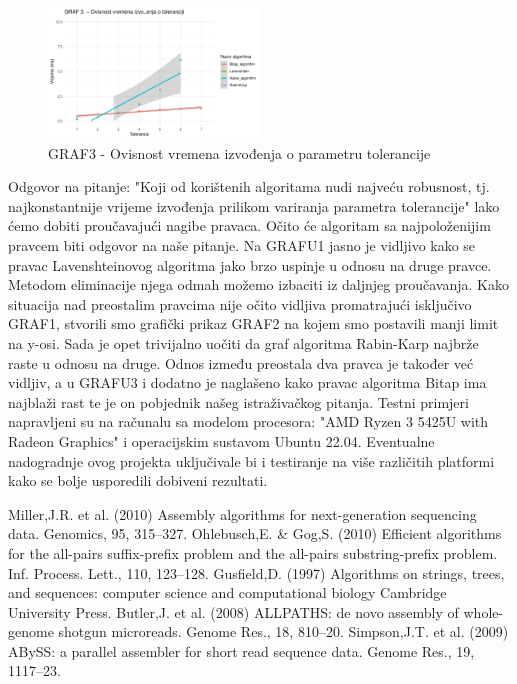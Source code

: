 \documentclass[conference]{IEEEtran}
\begin{document}
\begin{figure}[htbp]
\centerline{\includegraphics[width=0.5\textwidth]{Grafovi_i_csv_datoteke/GRAF3.png}}
\caption{GRAF3 - Ovisnost vremena izvođenja o parametru tolerancije}
\label{fig}
\end{figure}
\newpage
Odgovor na pitanje: "Koji od korištenih algoritama nudi najveću robusnost, tj. najkonstantnije vrijeme izvođenja prilikom variranja parametra tolerancije" lako ćemo dobiti proučavajući nagibe pravaca. Očito će algoritam sa najpoloženijim pravcem biti odgovor na naše pitanje. 
Na GRAFU1 jasno je vidljivo kako se pravac Lavenshteinovog algoritma jako brzo uspinje u odnosu na druge pravce. Metodom eliminacije njega odmah možemo izbaciti iz daljnjeg proučavanja.
Kako situacija nad preostalim pravcima nije očito vidljiva promatrajući isključivo GRAF1, stvorili smo grafički prikaz GRAF2 na kojem smo postavili manji limit na y-osi. Sada je opet trivijalno uočiti da graf algoritma Rabin-Karp najbrže raste u odnosu na druge.
Odnos između preostala dva pravca je također već vidljiv, a u GRAFU3 i dodatno je naglašeno kako pravac algoritma Bitap ima najblaži rast te je on pobjednik našeg istraživačkog pitanja.
Testni primjeri napravljeni su na računalu sa modelom procesora: "AMD Ryzen 3 5425U with Radeon Graphics" i operacijskim sustavom Ubuntu 22.04. Eventualne nadogradnje ovog projekta uključivale bi i testiranje na više različitih platformi kako se bolje usporedili dobiveni rezultati.

\begin{thebibliography}{00}
 Miller,J.R. et al. (2010) Assembly algorithms for next-generation sequencing data.
Genomics, 95, 315–327.
 Ohlebusch,E. \& Gog,S. (2010) Efficient algorithms for the all-pairs suffix-prefix problem and the all-pairs substring-prefix problem. Inf. Process. Lett., 110, 123–128.
 Gusfield,D. (1997) Algorithms on strings, trees, and sequences: computer science and
computational biology Cambridge University Press.
 Butler,J. et al. (2008) ALLPATHS: de novo assembly of whole-genome shotgun
microreads. Genome Res., 18, 810–20.
 Simpson,J.T. et al. (2009) ABySS: a parallel assembler for short read sequence data.
Genome Res., 19, 1117–23.

\end{thebibliography}
\end{document}
